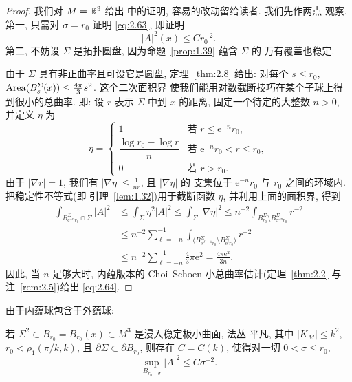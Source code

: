 \begin{proof}
我们对 $M=\mathbb{R}^3$ 给出 \cite{CM2} 中的证明, 容易的改动留给读者. 我们先作两点
观察. 第一, 只需对 $\sigma=r_0$ 证明 \eqref{eq:2.63}, 即证明
\begin{equation}
|A|^{2}(x)\leq Cr_0^{-2}.
\label{eq:2.64}
\end{equation}
第二, 不妨设 $\Sigma$ 是拓扑圆盘, 因为命题~\ref{prop:1.39} 蕴含 $\Sigma$ 的
万有覆盖也稳定.

由于 $\Sigma$ 具有非正曲率且可设它是圆盘, 定理~\ref{thm:2.8} 给出: 对每个
$s\leq r_0$, $\operatorname{Area}(B_s^{\Sigma}(x))\leq\frac{4\pi}{3}s^{2}$. 这个二次面积界
使我们能用对数截断技巧在某个子球上得到很小的总曲率. 即: 设 $r$ 表示 $\Sigma$
中到 $x$ 的距离, 固定一个待定的大整数 $n>0$, 并定义 $\eta$ 为
\begin{equation}
\eta=\begin{cases}
1 & \text{若 } r\leq\mathrm{e}^{-n}r_0,\\
\dfrac{\log r_0-\log r}{n}
 & \text{若 } \mathrm{e}^{-n}r_0<r\leq r_0,\\
0 & \text{若 } r>r_0.
\end{cases}
\label{eq:2.65}
\end{equation}
由于 $|\nabla r|=1$, 我们有 $|\nabla\eta|\leq\frac{1}{nr}$, 且 $|\nabla\eta|$ 的
支集位于 $\mathrm{e}^{-n}r_0$ 与 $r_0$ 之间的环域内. 把稳定性不等式(即
引理~\ref{lem:1.32})用于截断函数 $\eta$, 并利用上面的面积界, 得到
\begin{equation}
\begin{aligned}
\int_{B_{\mathrm{e}^{-n}r_0}^{\Sigma}\cap\Sigma}|A|^{2}
&\leq\int_\Sigma\eta^{2}|A|^{2}\leq\int_\Sigma|\nabla\eta|^{2}
 \leq n^{-2}\int_{B_{r_0}^{\Sigma}\setminus
 B_{\mathrm{e}^{-n}r_0}^{\Sigma}}r^{-2}\\
&\leq n^{-2}\sum_{\ell=-n}^{-1}
 \int_{\bigl(B_{\mathrm{e}^{\ell+1}r_0}^{\Sigma}
 \setminus B_{\mathrm{e}^{\ell}r_0}^{\Sigma}\bigr)}r^{-2}\\
&\leq n^{-2}\sum_{\ell=-n}^{-1}\frac{4}{3}\pi\mathrm{e}^{2}
 =\frac{4\pi\mathrm{e}^{2}}{3n}.
\end{aligned}
\label{eq:2.66}
\end{equation}
因此, 当 $n$ 足够大时, 内蕴版本的 Choi--Schoen 小总曲率估计(定理~\ref{thm:2.2}
与注~\ref{rem:2.5})给出 \eqref{eq:2.64}.
\end{proof}

由于内蕴球包含于外蕴球:

\begin{corollary}
\label{cor:2.11}
若 $\Sigma^2\subset B_{r_0}=B_{r_0}(x)\subset M^3$ 是浸入稳定极小曲面, 法丛
平凡, 其中 $|K_M|\leq k^{2}$, $r_0<\rho_1(\pi/k,k)$, 且
$\partial\Sigma\subset\partial B_{r_0}$, 则存在 $C=C(k)$, 使得对一切
$0<\sigma\leq r_0$,
\begin{equation}
\sup_{B_{r_0-\sigma}}|A|^{2}\leq C\sigma^{-2}.
\label{eq:2.67}
\end{equation}
\end{corollary}

